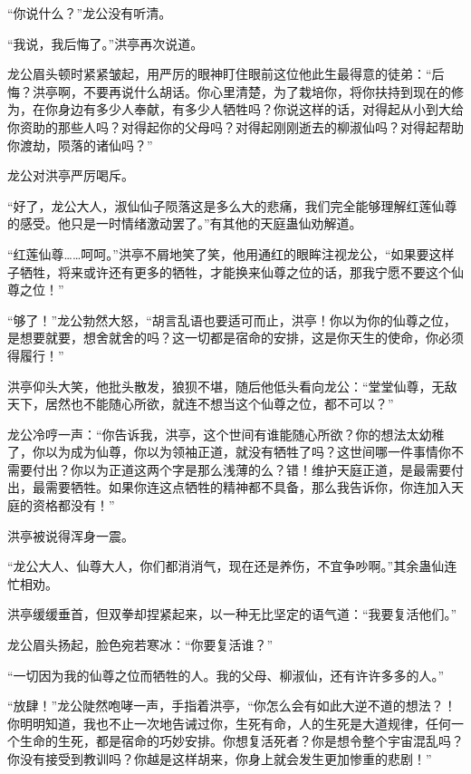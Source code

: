 
\begin{this_body}

“你说什么？”龙公没有听清。

“我说，我后悔了。”洪亭再次说道。

龙公眉头顿时紧紧皱起，用严厉的眼神盯住眼前这位他此生最得意的徒弟：“后悔？洪亭啊，不要再说什么胡话。你心里清楚，为了栽培你，将你扶持到现在的修为，在你身边有多少人奉献，有多少人牺牲吗？你说这样的话，对得起从小到大给你资助的那些人吗？对得起你的父母吗？对得起刚刚逝去的柳淑仙吗？对得起帮助你渡劫，陨落的诸仙吗？”

龙公对洪亭严厉喝斥。

“好了，龙公大人，淑仙仙子陨落这是多么大的悲痛，我们完全能够理解红莲仙尊的感受。他只是一时情绪激动罢了。”有其他的天庭蛊仙劝解道。

“红莲仙尊……呵呵。”洪亭不屑地笑了笑，他用通红的眼眸注视龙公，“如果要这样子牺牲，将来或许还有更多的牺牲，才能换来仙尊之位的话，那我宁愿不要这个仙尊之位！”

“够了！”龙公勃然大怒，“胡言乱语也要适可而止，洪亭！你以为你的仙尊之位，是想要就要，想舍就舍的吗？这一切都是宿命的安排，这是你天生的使命，你必须得履行！”

洪亭仰头大笑，他批头散发，狼狈不堪，随后他低头看向龙公：“堂堂仙尊，无敌天下，居然也不能随心所欲，就连不想当这个仙尊之位，都不可以？”

龙公冷哼一声：“你告诉我，洪亭，这个世间有谁能随心所欲？你的想法太幼稚了，你以为成为仙尊，你以为领袖正道，就没有牺牲了吗？这世间哪一件事情你不需要付出？你以为正道这两个字是那么浅薄的么？错！维护天庭正道，是最需要付出，最需要牺牲。如果你连这点牺牲的精神都不具备，那么我告诉你，你连加入天庭的资格都没有！”

洪亭被说得浑身一震。

“龙公大人、仙尊大人，你们都消消气，现在还是养伤，不宜争吵啊。”其余蛊仙连忙相劝。

洪亭缓缓垂首，但双拳却捏紧起来，以一种无比坚定的语气道：“我要复活他们。”

龙公眉头扬起，脸色宛若寒冰：“你要复活谁？”

“一切因为我的仙尊之位而牺牲的人。我的父母、柳淑仙，还有许许多多的人。”

“放肆！”龙公陡然咆哮一声，手指着洪亭，“你怎么会有如此大逆不道的想法？！你明明知道，我也不止一次地告诫过你，生死有命，人的生死是大道规律，任何一个生命的生死，都是宿命的巧妙安排。你想复活死者？你是想令整个宇宙混乱吗？你没有接受到教训吗？你越是这样胡来，你身上就会发生更加惨重的悲剧！”


\end{this_body}
